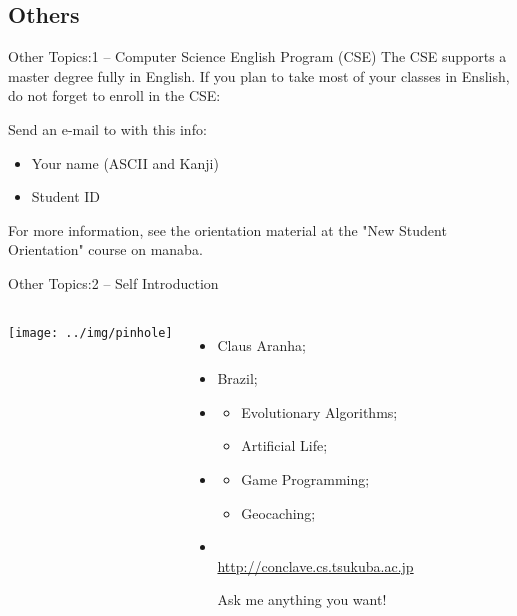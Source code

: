\documentclass[aspectratio=169]{beamer}
\begin{document}
\begin{CJK}{UTF8}{ipxm}
\section{Others}
\begin{frame}{Other Topics:}{1 -- Computer Science English Program (CSE)}
  The CSE supports a master degree fully in English. If you plan to take most of your classes in Enslish, do not forget to enroll in the CSE:
  \bigskip

  Send an e-mail to  with this info:
  \begin{itemize}
    \item Your name (ASCII and Kanji)
    \item Student ID
  \end{itemize}

  For more information, see the orientation material at the "New Student Orientation" course on manaba.
\end{frame}

\begin{frame}{Other Topics:}{2 -- Self Introduction}
  \begin{columns}
    \texttt{[image: ../img/pinhole]}
    {\small
    \begin{itemize}
      \item {} Claus Aranha;
      \item {} Brazil;
      \item {}
      \begin{itemize}
        \item Evolutionary Algorithms;
        \item Artificial Life;
      \end{itemize}
      \item {}
      \begin{itemize}
        \item Game Programming;
        \item Geocaching;
      \end{itemize}
        \medskip

      \item {}\\
      {\smaller \url{http://conclave.cs.tsukuba.ac.jp}}
      \medskip

      Ask me anything you want!
    \end{itemize}
    }
  \end{columns}
\end{frame}


\end{CJK}
\end{document}
